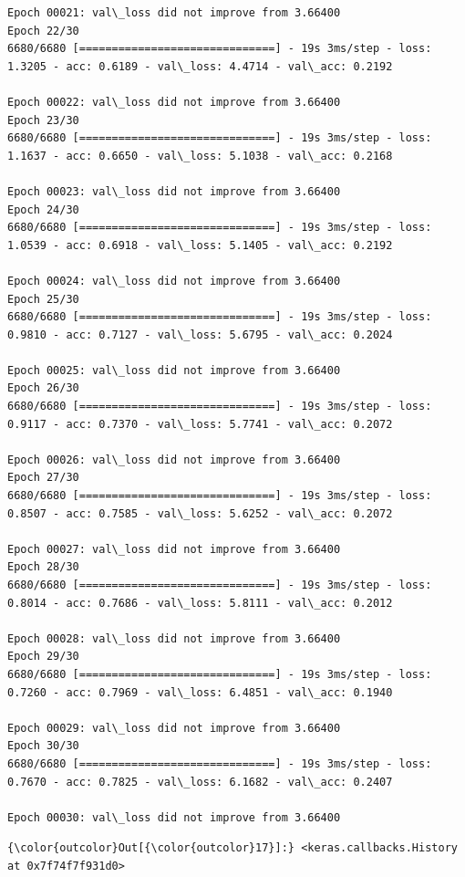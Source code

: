 \documentclass[11pt]{article}
\begin{document}
\begin{Verbatim}[commandchars=\\\{\}]
Epoch 00021: val\_loss did not improve from 3.66400
Epoch 22/30
6680/6680 [==============================] - 19s 3ms/step - loss: 1.3205 - acc: 0.6189 - val\_loss: 4.4714 - val\_acc: 0.2192

Epoch 00022: val\_loss did not improve from 3.66400
Epoch 23/30
6680/6680 [==============================] - 19s 3ms/step - loss: 1.1637 - acc: 0.6650 - val\_loss: 5.1038 - val\_acc: 0.2168

Epoch 00023: val\_loss did not improve from 3.66400
Epoch 24/30
6680/6680 [==============================] - 19s 3ms/step - loss: 1.0539 - acc: 0.6918 - val\_loss: 5.1405 - val\_acc: 0.2192

Epoch 00024: val\_loss did not improve from 3.66400
Epoch 25/30
6680/6680 [==============================] - 19s 3ms/step - loss: 0.9810 - acc: 0.7127 - val\_loss: 5.6795 - val\_acc: 0.2024

Epoch 00025: val\_loss did not improve from 3.66400
Epoch 26/30
6680/6680 [==============================] - 19s 3ms/step - loss: 0.9117 - acc: 0.7370 - val\_loss: 5.7741 - val\_acc: 0.2072

Epoch 00026: val\_loss did not improve from 3.66400
Epoch 27/30
6680/6680 [==============================] - 19s 3ms/step - loss: 0.8507 - acc: 0.7585 - val\_loss: 5.6252 - val\_acc: 0.2072

Epoch 00027: val\_loss did not improve from 3.66400
Epoch 28/30
6680/6680 [==============================] - 19s 3ms/step - loss: 0.8014 - acc: 0.7686 - val\_loss: 5.8111 - val\_acc: 0.2012

Epoch 00028: val\_loss did not improve from 3.66400
Epoch 29/30
6680/6680 [==============================] - 19s 3ms/step - loss: 0.7260 - acc: 0.7969 - val\_loss: 6.4851 - val\_acc: 0.1940

Epoch 00029: val\_loss did not improve from 3.66400
Epoch 30/30
6680/6680 [==============================] - 19s 3ms/step - loss: 0.7670 - acc: 0.7825 - val\_loss: 6.1682 - val\_acc: 0.2407

Epoch 00030: val\_loss did not improve from 3.66400

    \end{Verbatim}

\begin{Verbatim}[commandchars=\\\{\}]
{\color{outcolor}Out[{\color{outcolor}17}]:} <keras.callbacks.History at 0x7f74f7f931d0>
\end{Verbatim}
            
\end{document}
